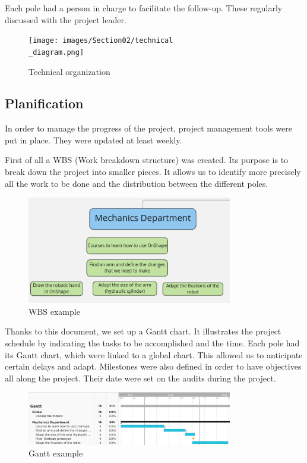 \bigbreak
Each pole had a person in charge to facilitate the follow-up. These regularly discussed with the project leader.

\begin{figure}[ht]
    \centering
    \texttt{[image: images/Section02/technical\\\_diagram.png]}
    \caption{Technical organization}
    \label{fig:mesh3}
\end{figure}
\FloatBarrier

\subsection{Planification}

In order to manage the progress of the project, project management tools were put in place. They were updated at least weekly.

\bigbreak
First of all a WBS (Work breakdown structure) was created. Its purpose is to break down the project into smaller pieces. It allows us to identify more precisely all the work to be done and the distribution between the different poles. 

\begin{figure}[ht]
    \centering
    \includegraphics[width=0.8\textwidth]{images/Section02/wbs.png}
    \caption{WBS example}
    \label{fig:mesh4}
\end{figure}
\FloatBarrier

\bigbreak
Thanks to this document, we set up a Gantt chart. It illustrates the project schedule by indicating the tasks to be accomplished and the time. Each pole had its Gantt chart, which were linked to a global chart. This allowed us to anticipate certain delays and adapt. Milestones were also defined in order to have objectives all along the project. Their date were set on the audits during the project.

\begin{figure}[ht]
    \centering
    \includegraphics[width=0.8\textwidth]{images/Section02/gantt.png}
    \caption{Gantt example}
    \label{fig:mesh5}
\end{figure}
\FloatBarrier

